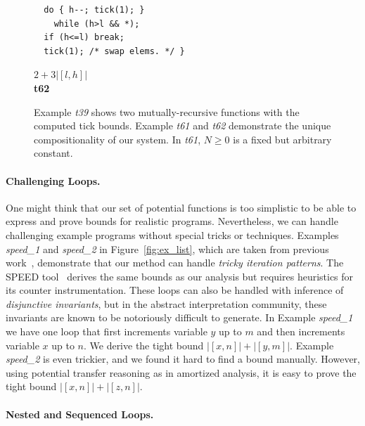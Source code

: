 \documentclass[nocopyrightspace,preprint,pldi]{sigplanconf-pldi15}
\newcommand{\ifshort}[2]{\ifx\fullversion\undefined{#1}\else{#2}\fi}
\newcommand{\paraskip}[0]{\ifshort{\vspace{-4pt}}{}}
\begin{document}
\begin{figure}
\begin{minipage}[b]{5.5cm}
\begin{center}
\begin{lstlisting}
  do { h--; tick(1); }
    while (h>l && *);
  if (h<=l) break;
  tick(1); /* swap elems. */ }
\end{lstlisting}
$2+3|[l,h]|$
\\[.4\baselineskip]
      {\bf t62}
    \end{center}
  \end{minipage}
\vspace{1ex}
\caption{Example \emph{t39} shows two mutually-recursive functions
  with the computed tick bounds.  Example \emph{t61} and \emph{t62}
  demonstrate the unique compositionality of our system. In \emph{t61},
  $N\geq 0$ is a fixed but arbitrary constant. %
  }
  \label{fig:ex_list_2}
\end{figure}

\paraskip
\paragraph{Challenging Loops.}

One might think that our set of potential functions is too simplistic
to be able to express and prove bounds for realistic
programs. Nevertheless, we can handle challenging example programs
without special tricks or techniques.  Examples \emph{speed\_1} and
\emph{speed\_2} in Figure~\ref{fig:ex_list}, which are taken from previous work~\cite{GulwaniMC09},
demonstrate that our method can handle \emph{tricky iteration
  patterns}.  The SPEED tool~\cite{GulwaniMC09} derives the same
bounds as our analysis but requires heuristics for its counter
instrumentation.  These loops can also be handled with inference of
\emph{disjunctive invariants}, but in the abstract interpretation
community, these invariants are known to be notoriously difficult to
generate.
%
In Example \emph{speed\_1} we have one loop that first increments
variable $y$ up to $m$ and then increments variable $x$ up to $n$.  We
derive the tight bound $|[x, n]| + |[y, m]|$.
%
Example \emph{speed\_2} is even trickier, and we found it hard to
find a bound manually.  However, using potential transfer reasoning as
in amortized analysis, it is easy to prove the tight bound
$|[x, n]| + |[z, n]|$.

\paraskip
\paragraph{Nested and Sequenced Loops.}
\end{document}
